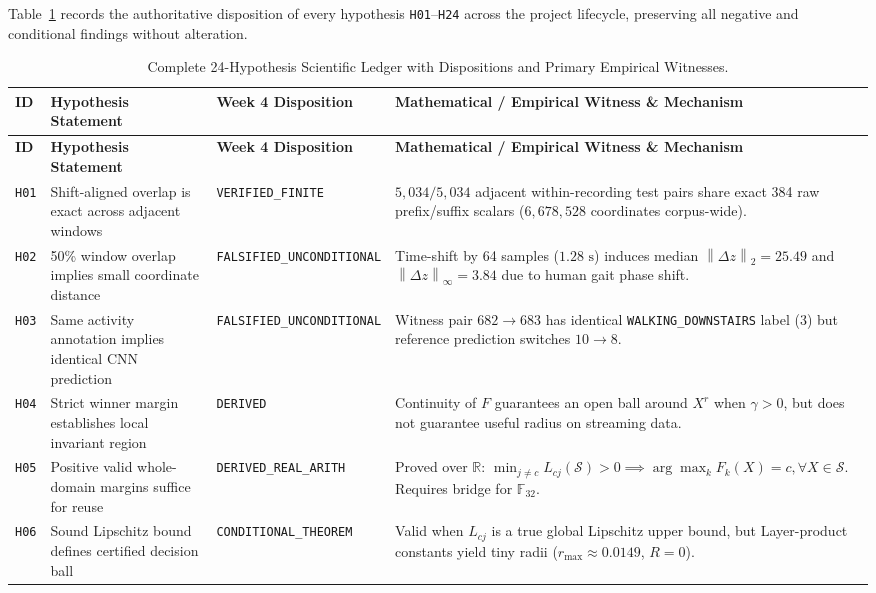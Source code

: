 \documentclass[11pt,a4paper]{article}
\newcommand{\R}{\mathbb{R}}
\newcommand{\F}{\mathbb{F}}
\newcommand{\norm}[1]{\left\lVert #1\right\rVert}
\newcommand{\code}[1]{{\small\ttfamily\nolinkurl{#1}}}
\newcommand{\Sset}{\mathcal{S}}
\theoremstyle{remark}
\begin{document}
Table~\ref{tab:ledger24} records the authoritative disposition of every hypothesis \code{H01}--\code{H24} across the project lifecycle, preserving all negative and conditional findings without alteration.

{\footnotesize
\begin{longtable}{@{}p{0.8cm}p{4.3cm}p{2.9cm}p{7.2cm}@{}}
\caption{Complete 24-Hypothesis Scientific Ledger with Dispositions and Primary Empirical Witnesses.}
\label{tab:ledger24}\\
\toprule
\textbf{ID} & \textbf{Hypothesis Statement} & \textbf{Week 4 Disposition} & \textbf{Mathematical / Empirical Witness \& Mechanism} \\
\midrule
\endfirsthead
\toprule
\textbf{ID} & \textbf{Hypothesis Statement} & \textbf{Week 4 Disposition} & \textbf{Mathematical / Empirical Witness \& Mechanism} \\
\midrule
\endhead
\bottomrule
\endfoot
\code{H01} & Shift-aligned overlap is exact across adjacent windows & \code{VERIFIED\_FINITE} & $5,034/5,034$ adjacent within-recording test pairs share exact 384 raw prefix/suffix scalars ($6,678,528$ coordinates corpus-wide). \\
\code{H02} & 50\% window overlap implies small coordinate distance & \code{FALSIFIED\_UNCONDITIONAL} & Time-shift by 64 samples ($1.28\text{ s}$) induces median $\norm{\Delta z}_2 = 25.49$ and $\norm{\Delta z}_\infty = 3.84$ due to human gait phase shift. \\
\code{H03} & Same activity annotation implies identical CNN prediction & \code{FALSIFIED\_UNCONDITIONAL} & Witness pair $682 \to 683$ has identical \code{WALKING\_DOWNSTAIRS} label (3) but reference prediction switches $10 \to 8$. \\
\code{H04} & Strict winner margin establishes local invariant region & \code{DERIVED} & Continuity of $F$ guarantees an open ball around $X^r$ when $\gamma > 0$, but does not guarantee useful radius on streaming data. \\
\code{H05} & Positive valid whole-domain margins suffice for reuse & \code{DERIVED\_REAL\_ARITH} & Proved over $\R$: $\min_{j \neq c} L_{cj}(\Sset) > 0 \implies \arg\max_k F_k(X) = c, \forall X \in \Sset$. Requires bridge for $\F_{32}$. \\
\code{H06} & Sound Lipschitz bound defines certified decision ball & \code{CONDITIONAL\_THEOREM} & Valid when $L_{cj}$ is a true global Lipschitz upper bound, but Layer-product constants yield tiny radii ($r_{\max} \approx 0.0149$, $R=0$). \\

\end{longtable}}
\end{document}
